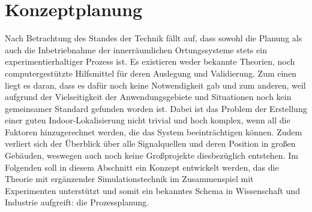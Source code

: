 \chapter{Konzeptplanung}
Nach Betrachtung des Standes der Technik fällt auf, dass sowohl die Planung als auch die Inbetriebnahme der innerräumlichen Ortungssysteme stets ein experimentierhaltiger Prozess ist. Es existieren weder bekannte Theorien, noch computergestützte Hilfsmittel für deren Auslegung und Validierung. Zum einen liegt es daran, dass es dafür noch keine Notwendigkeit gab und zum anderen, weil aufgrund der Vielseitigkeit der Anwendungsgebiete und Situationen noch kein gemeinsamer Standard gefunden worden ist. Dabei ist das Problem der Erstellung einer guten Indoor-Lokalisierung nicht trivial und hoch komplex, wenn all die Faktoren hinzugerechnet werden, die das System beeinträchtigen können. Zudem verliert sich der Überblick über alle Signalquellen und deren Position in großen Gebäuden, weswegen auch noch keine Großprojekte diesbezüglich entstehen. Im Folgenden soll in diesem Abschnitt ein Konzept entwickelt werden, das die Theorie mit ergänzender Simulationstechnik im Zusammenspiel mit Experimenten unterstützt und somit ein bekanntes Schema in Wissenschaft und Industrie aufgreift: die Prozessplanung.
